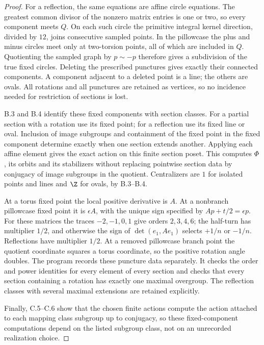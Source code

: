 \begin{proof}
For a reflection, the same equations are affine circle equations.  The
greatest common divisor of the nonzero matrix entries is one or two, so
every component meets $Q$.  On each such circle the primitive integral
kernel direction, divided by $12$, joins consecutive sampled points.
In the pillowcase the plus and minus circles meet only at two-torsion
points, all of which are included in $Q$.  Quotienting the sampled graph
by $p\sim-p$ therefore gives a subdivision of the true fixed circles.
Deleting the prescribed punctures gives exactly their connected
components.  A component adjacent to a deleted point is a line; the
others are ovals.  All rotations and all punctures are retained as
vertices, so no incidence needed for restriction of sections is lost.

B.3 and B.4 identify these fixed components with section classes.
For a partial section with a rotation use its fixed point; for a
reflection use its fixed line or oval.  Inclusion of image subgroups and
containment of the fixed point in the fixed component determine exactly
when one section extends another.  Applying each affine element gives
the exact action on this finite section poset.  This computes $\Phi$,
its orbits and its stabilizers without replacing pointwise section data
by conjugacy of image subgroups in the quotient.  Centralizers are $1$
for isolated points and lines and $\Z$ for ovals, by B.3--B.4.

At a torus fixed point the local positive derivative is $A$.  At a
nonbranch pillowcase fixed point it is $\epsilon A$, with the unique
sign specified by $Ap+t/2=\epsilon p$.  For these matrices the traces
$-2,-1,0,1$ give orders $2,3,4,6$; the half-turn has multiplier $1/2$,
and otherwise the sign of $\det(e_1,Ae_1)$ selects $+1/n$ or $-1/n$.
Reflections have multiplier $1/2$.  At a removed pillowcase branch
point the quotient coordinate squares a torus coordinate, so the
positive rotation angle doubles.  The program records these puncture
data separately.  It checks the order and power identities for every
element of every section and checks that every section containing a
rotation has exactly one maximal overgroup.  The reflection classes
with several maximal extensions are retained explicitly.

Finally, C.5--C.6 show that the chosen finite actions compute the action
attached to each mapping class subgroup up to conjugacy, so these
fixed-component computations depend on the listed subgroup class, not
on an unrecorded realization choice.
\end{proof}

